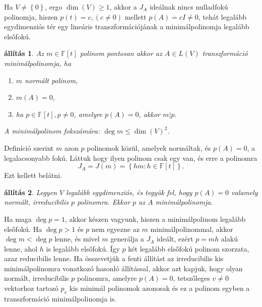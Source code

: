 \documentclass[a4paper, showtrims]{memoir}
\makeatletter
\renewenvironment{proof}[1][\proofname]
    {\par\pushQED{\qed}%
    \normalfont \topsep6\p@\@plus6\p@\relax
    \trivlist
    \item[\hskip\labelsep
        \itshape
    #1\@addpunct{:}]\ignorespaces}
    {\popQED\endtrivlist\@endpefalse}
\theoremstyle{plain}
\newtheorem{proposition}{állítás}[chapter]
\theoremstyle{remark}
\theoremstyle{definition}
\makeatother
\begin{document}
Ha $V\neq\left\{ 0 \right\}$, ergo $\dim(V)\geq 1$,
akkor a $J_{A}$ ideálnak nincs nulladfokú polinomja,
hiszen $p(t)=c, (c\neq 0)$ mellett
$p\left( A \right)=cI\neq 0$,
tehát legalább egydimenziós tér egy lineáris transzformációjának a minimálpolinomja legalább elsőfokú.
\begin{proposition}
	Az  $m\in\mathbb{F}\left[ t \right]$ polinom pontosan akkor
	az $A\in L\left( V \right)$ transzformáció minimálpolinomja,
	ha
	\begin{enumerate}
		\item $m$ normált polinom,
		\item $m\left( A \right)=0$,
		\item ha $p\in\mathbb{F}\left[ t \right], p\neq 0$, amelyre
		      $p\left( A \right)=0$, akkor $m|p$.
	\end{enumerate}
	A minimálpolinom fokszámára:
	$\deg m\leq\dim(V)^2$.
\end{proposition}
\begin{proof}
	Definíció szerint $m$ azon $p$ polinomok közül,
	amelyek normáltak, és $p\left( A \right)=0$, a legalacsonyabb fokú.
	Láttuk hogy ilyen polinom csak egy van, és erre a polinomra
	\[
		J_{A}=J\left( m \right)=\left\{ hm:h\in\mathbb{F}\left[ t \right] \right\}.
	\]
	Ezt kellett belátni.
\end{proof}
\begin{proposition}
	Legyen $V$ legalább egydimenziós,
	és tegyük fel, hogy $p\left( A \right)=0$ valamely normált,
	irreducibilis $p$ polinomra.
	Ekkor $p$ az $A$ minimálpolinomja.
\end{proposition}
\begin{proof}
	Ha maga $\deg p=1$, akkor készen vagyunk, hiszen a minimálpolinom legalább elsőfokú.
	Ha $\deg p>1$ és $p$ nem egyezne az $m$ minimálpolinommal,
	akkor $\deg m<\deg p$ lenne, és mivel $m$ generálja a $J_{A}$ ideált,
	ezért $p=mh$ alakú lenne, ahol $h$ is legalább elsőfokú.
	Így $p$ két legalább elsőfokú polinom szorzata, azaz reducibilis lenne.
\end{proof}
Ha összevetjük a fenti állítást az irreducibilis kis minimálpolinomra vonatkozó hasonló állítással,
akkor azt kapjuk, hogy olyan normált, irreducibilis $p$ polinomra, 
amelyre $p\left( A \right)=0$, tetszőleges $v\neq 0$ vektorhoz tartozó $p_v$ kis minimál polinomok azonosak
és ez a polinom egyben a transzformáció minimálpolinomja is.
\end{document}
